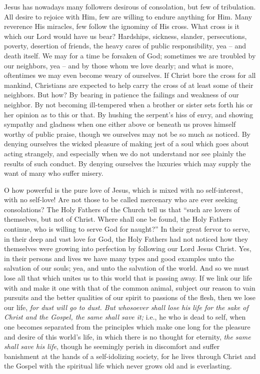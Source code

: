 Jesus has nowadays many followers desirous 
of consolation, but few of tribulation. All desire
to rejoice with Him, few are willing to 
endure anything for Him. Many reverence His
miracles, few follow the ignominy of His cross. 
What cross is it which our Lord would have 
us bear? Hardships, sickness, slander, persecutions,
poverty, desertion of friends, the heavy 
cares of public responsibility, yea -- and death 
itself. We may for a time be forsaken of God; 
sometimes we are troubled by our neighbors, 
yea -- and by those whom we love dearly; and 
what is more, oftentimes we may even become 
weary of ourselves. If Christ bore the cross 
for all mankind, Christians are expected to help 
carry the cross of at least some of their neighbors.
But how? By bearing in patience the 
failings and weakness of our neighbor. By not 
becoming ill-tempered when a brother or sister 
sets forth his or her opinion as to this or that. 
By hushing the serpent's hiss of envy, and 
showing sympathy and gladness when one either 
above or beneath us proves himself worthy of 
public praise, though we ourselves may not be 
so much as noticed. By denying ourselves the 
wicked pleasure of making jest of a soul which 
goes about acting strangely, and especially when 
we do not understand nor see plainly the results 
of such conduct. By denying ourselves the 
luxuries which may supply the want of many 
who suffer misery.

O how powerful is the pure 
love of Jesus, which is mixed with no self-interest,
with no self-love! Are not those to be 
called mercenary who are ever seeking consolations?
The Holy Fathers of the Church tell 
us that ``such are lovers of themselves, but not 
of Christ. Where shall one be found, the Holy 
Fathers continue, who is willing to serve God 
for naught?'' In their great fervor to serve, in 
their deep and vast love for God, the Holy 
Fathers had not noticed how they themselves 
were growing into perfection by following our 
Lord Jesus Christ. Yes, in their persons and 
lives we have many types and good examples 
unto the salvation of our souls; yea, and unto 
the salvation of the world. And so we must 
lose all that which unites us to this world that 
is passing away. If we link our life with and 
make it one with that of the common animal, 
subject our reason to vain pursuits and the better
qualities of our spirit to passions of the flesh, 
then we lose our life, \textit{for dust will go to dust. 
But whosoever shall lose his life for the sake 
of Christ and the Gospel, the same shall save it;} 
i.e., he who is dead to self, when one becomes
separated from the principles which make one 
long for the pleasure and desire of this world's 
life, in which there is no thought for eternity, 
\textit{the same shall save his life}, though he seemingly
perish in discomfort and suffer banishment
at the hands of a self-idolizing society, for 
he lives through Christ and the Gospel with the 
spiritual life which never grows old and is everlasting.

